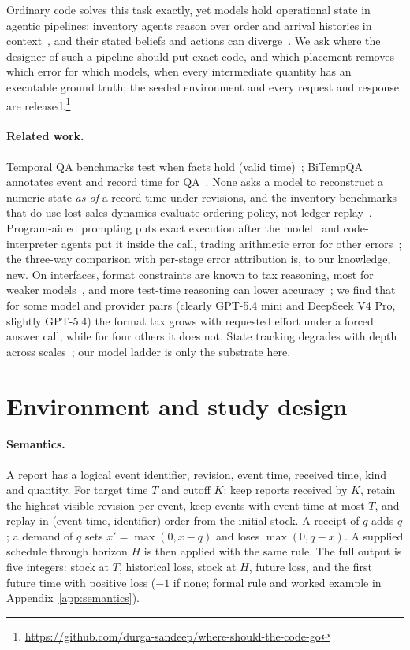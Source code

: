\documentclass{article}
\begin{document}
Ordinary code solves this task exactly, yet models hold operational state in agentic
pipelines: inventory agents reason over order and arrival histories in
context~\citep{baek2026inventory}, and their stated beliefs and actions can
diverge~\citep{deb2026stocktake}. We ask where the designer of such a pipeline should put
exact code, and which placement removes which error for which models, when every
intermediate quantity has an executable ground truth; the seeded environment and every
request and response are released.\footnote{\url{https://github.com/durga-sandeep/where-should-the-code-go}}

\paragraph{Related work.}
Temporal QA benchmarks test when facts hold (valid
time)~\citep{chu2024timebench,luo2025etrqa,wei2025time,weng2026temporalbench,tdbench2025,evolveqa2025}; BiTempQA annotates
event and record time for QA~\citep{bitempqa}. None asks a model to reconstruct a numeric
state \emph{as of} a record time under revisions, and the inventory benchmarks that do use
lost-sales dynamics evaluate ordering policy, not ledger replay~\citep{baek2026inventory,deb2026stocktake}.
Program-aided prompting puts exact execution after the model~\citep{gao2023pal,chen2023pot}
and code-interpreter agents put it inside the call, trading arithmetic error for other
errors~\citep{toolmyopia2025}; the three-way comparison with per-stage error attribution is,
to our knowledge, new. On interfaces, format
constraints are known to tax reasoning, most for weaker
models~\citep{tam2024speakfreely,banerjee2025crane,fan2026capacity}, and more test-time
reasoning can lower accuracy~\citep{gema2025inverse}; we find that for some model and
provider pairs (clearly GPT-5.4 mini and DeepSeek V4 Pro, slightly GPT-5.4) the format tax
grows with requested effort under a forced answer call, while for four others it does not. State tracking degrades with depth across
scales~\citep{wmfam2026,sinha2025illusion}; our model ladder is only the substrate here.

\section{Environment and study design}
\paragraph{Semantics.}
A report has a logical event identifier, revision, event time, received time, kind and
quantity. For target time $T$ and cutoff $K$: keep reports received by $K$, retain the
highest visible revision per event, keep events with event time at most $T$, and replay
in (event time, identifier) order from the initial stock. A receipt of $q$ adds $q$; a
demand of $q$ sets $x'=\max(0,x-q)$ and loses $\max(0,q-x)$. A supplied schedule through
horizon $H$ is then applied with the same rule. The full output is five integers: stock at
$T$, historical loss, stock at $H$, future loss, and the first future time with positive
loss ($-1$ if none; formal rule and worked example in Appendix~\ref{app:semantics}).
\end{document}
